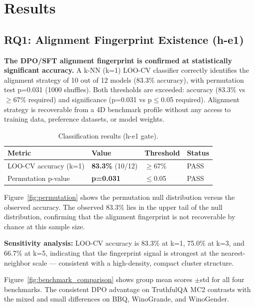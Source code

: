 \section{Results}
\label{sec:results}

\subsection{RQ1: Alignment Fingerprint Existence (h-e1)}

\textbf{The DPO/SFT alignment fingerprint is confirmed at statistically significant accuracy.}
A k-NN (k=1) LOO-CV classifier correctly identifies the alignment strategy of 10 out
of 12 models (83.3\% accuracy), with permutation test p=0.031 (1000 shuffles). Both
thresholds are exceeded: accuracy (83.3\% vs $\geq$67\% required) and significance (p=0.031
vs p$\leq$0.05 required). Alignment strategy is recoverable from a 4D benchmark profile
without any access to training data, preference datasets, or model weights.

\begin{table}[h]
\centering
\caption{Classification results (h-e1 gate).}
\label{tab:classification}
\begin{tabular}{llll}
\toprule
Metric & Value & Threshold & Status \\
\midrule
LOO-CV accuracy (k=1) & \textbf{83.3\%} (10/12) & $\geq$67\% & PASS \\
Permutation p-value & \textbf{p=0.031} & $\leq$0.05 & PASS \\
\bottomrule
\end{tabular}
\end{table}

Figure~\ref{fig:permutation} shows the permutation null distribution versus the
observed accuracy. The observed 83.3\% lies in the upper tail of the null distribution,
confirming that the alignment fingerprint is not recoverable by chance at this sample size.

\textbf{Sensitivity analysis:} LOO-CV accuracy is 83.3\% at k=1, 75.0\% at k=3, and 66.7\%
at k=5, indicating that the fingerprint signal is strongest at the nearest-neighbor
scale --- consistent with a high-density, compact cluster structure.

Figure~\ref{fig:benchmark_comparison} shows group mean scores $\pm$std for all four
benchmarks. The consistent DPO advantage on TruthfulQA MC2 contrasts with the mixed
and small differences on BBQ, WinoGrande, and WinoGender.

